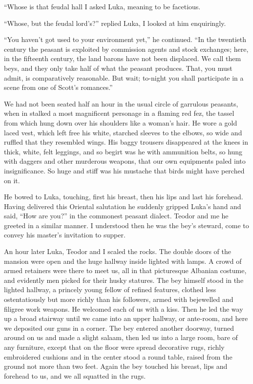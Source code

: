 \documentclass[a5paper,12pt]{book}
\begin{document}
“Whose is that feudal hall I asked Luka, meaning to be facetious. 

“Whose, but the feudal lord’s?” replied Luka, I looked at him enquiringly. 

“You haven’t got used to your environment yet,” he continued. “In the twentieth century the peasant is exploited by commission agents and stock exchanges; here, in the fifteenth century, the land barons have not been displaced. We call them beys, and they only take half of what the peasant produces. That, you must admit, is comparatively reasonable. But wait; to-night you shall participate in a scene from one of Scott’s romances.” 

We had not been seated half an hour in the usual circle of garrulous peasants, when in stalked a most magnificent personage in a flaming red fez, the tassel from which hung down over his shoulders like a woman’s hair. He wore a gold laced vest, which left free his white, starched sleeves to the elbows, so wide and ruffled that they resembled wings. His baggy trousers disappeared at the knees in thick, white, felt leggings, and so begirt was he with ammunition belts, so hung with daggers and other murderous weapons, that our own equipments paled into insignificance. So huge and stiff was his mustache that birds might have perched on it. 

He bowed to Luka, touching, first his breast, then his lips and last his forehead. Having delivered this Oriental salutation he suddenly gripped Luka’s hand and said, “How are you?” in the commonest peasant dialect. Teodor and me he greeted in a similar manner. I understood then he was the bey’s steward, come to convey his master’s invitation to supper. 

An hour later Luka, Teodor and I scaled the rocks. The double doors of the mansion were open and the huge hallway inside lighted with lamps. A crowd of armed retainers were there to meet us, all in that picturesque Albanian costume, and evidently men picked for their husky statures. The bey himself stood in the lighted hallway, a princely young fellow of refined features, clothed less ostentatiously but more richly than his followers, armed with bejewelled and filigree work weapons. He welcomed each of us with a kiss. Then he led the way up a broad stairway until we came into an upper hallway, or ante-room, and here we deposited our guns in a corner. The bey entered another doorway, turned around on us and made a slight salaam, then led us into a large room, bare of any furniture, except that on the floor were spread decorative rugs, richly embroidered cushions and in the center stood a round table, raised from the ground not more than two feet. Again the bey touched his breast, lips and forehead to us, and we all squatted in the rugs. 
\end{document}
